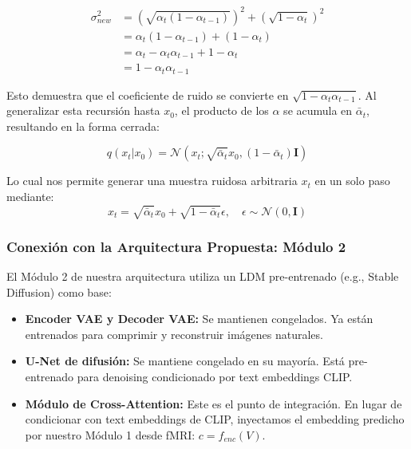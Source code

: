 \documentclass{article}
\begin{document}
\begin{equation}
\begin{aligned}
    \sigma_{new}^2 &= (\sqrt{\alpha_t(1-\alpha_{t-1})})^2 + (\sqrt{1-\alpha_t})^2 \\
    &= \alpha_t(1-\alpha_{t-1}) + (1-\alpha_t) \\
    &= \alpha_t - \alpha_t\alpha_{t-1} + 1 - \alpha_t \\
    &= 1 - \alpha_t\alpha_{t-1}
\end{aligned}
\end{equation}

Esto demuestra que el coeficiente de ruido se convierte en $\sqrt{1 - \alpha_t\alpha_{t-1}}$. Al generalizar esta recursión hasta $x_0$, el producto de los $\alpha$ se acumula en $\bar{\alpha}_t$, resultando en la forma cerrada:

\begin{equation}
    q(x_t | x_0) = \mathcal{N}(x_t; \sqrt{\bar{\alpha}_t}x_0, (1 - \bar{\alpha}_t)\mathbf{I})
\end{equation}

Lo cual nos permite generar una muestra ruidosa arbitraria $x_t$ en un solo paso mediante:
\begin{equation}
    x_t = \sqrt{\bar{\alpha}_t}x_0 + \sqrt{1-\bar{\alpha}_t}\epsilon, \quad \epsilon \sim \mathcal{N}(0, \mathbf{I})
\end{equation}

\subsubsection{Conexión con la Arquitectura Propuesta: Módulo 2}

El Módulo 2 de nuestra arquitectura utiliza un LDM pre-entrenado (e.g., Stable Diffusion) como base:
\begin{itemize}
    \item \textbf{Encoder VAE y Decoder VAE:} Se mantienen congelados. Ya están entrenados para comprimir y reconstruir imágenes naturales.
    \item \textbf{U-Net de difusión:} Se mantiene congelado en su mayoría. Está pre-entrenado para denoising condicionado por text embeddings CLIP.
    \item \textbf{Módulo de Cross-Attention:} Este es el punto de integración. En lugar de condicionar con text embeddings de CLIP, inyectamos el embedding predicho por nuestro Módulo 1 desde fMRI: $c = f_{enc}(V)$.
\end{itemize}
\end{document}
